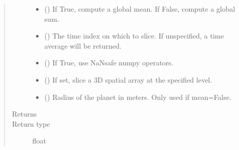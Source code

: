 \documentclass[letterpaper,10pt,english]{sphinxmanual}
\begin{document}
\begin{fulllineitems}
\begin{quote}
\begin{description}
\begin{itemize}
\item {} 
 (\sphinxstyleliteralemphasis{\sphinxupquote{, }}) \textendash{} If True, compute a global mean. If False, compute a global sum.

\item {} 
 (\sphinxstyleliteralemphasis{\sphinxupquote{, }}) \textendash{} The time index on which to slice. If unspecified, a time average will be returned.

\item {} 
 (\sphinxstyleliteralemphasis{\sphinxupquote{, }}) \textendash{} If True, use NaN\sphinxhyphen{}safe numpy operators.

\item {} 
 (\sphinxstyleliteralemphasis{\sphinxupquote{, }}) \textendash{} If set, slice a 3D spatial array at the specified level.

\item {} 
 (\sphinxstyleliteralemphasis{\sphinxupquote{, }}) \textendash{} Radius of the planet in meters. Only used if mean=False.

\end{itemize}

\item[{Returns}] \leavevmode


\item[{Return type}] \leavevmode
float

\end{description}\end{quote}

\end{fulllineitems}

\end{document}
